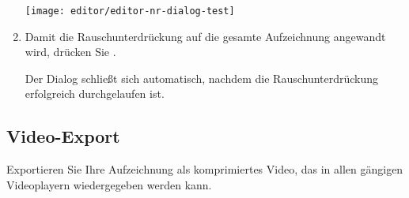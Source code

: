 \begin{enumerate}
	\begin{minipage}{0.9\textwidth}
		\centering
		\captionsetup{type=figure}
		\texttt{[image: editor/editor-nr-dialog-test]}
		\label{fig:editor-nr-dialog-test}
	\end{minipage}

	\item Damit die Rauschunterdrückung auf die gesamte Aufzeichnung angewandt wird, drücken Sie .
	
	Der Dialog schließt sich automatisch, nachdem die Rauschunterdrückung erfolgreich durchgelaufen ist.
\end{enumerate}


\subsection{Video-Export}
Exportieren Sie Ihre Aufzeichnung als komprimiertes Video, das in allen gängigen Videoplayern wiedergegeben werden kann.

